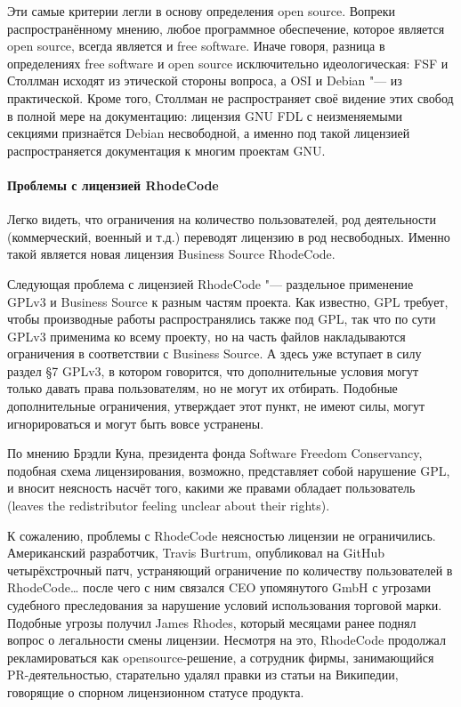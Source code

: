 \documentclass[10pt, a5paper]{article}
\begin{document}
Эти самые критерии легли в основу определения open source. Вопреки распространённому мнению, любое программное обеспечение, которое является open source, всегда является и free software. Иначе говоря, разница в определениях free software и open source исключительно идеологическая: FSF и Столлман исходят из этической стороны вопроса, а OSI и Debian "--- из практической. Кроме того, Столлман не распространяет своё видение этих свобод в полной мере на документацию: лицензия GNU FDL с неизменяемыми секциями признаётся Debian несвободной, а именно под такой лицензией распространяется документация к многим проектам GNU.

\paragraph{Проблемы с лицензией RhodeCode}

Легко видеть, что ограничения на количество пользователей, род деятельности (коммерческий, военный и т.д.) переводят лицензию в род несвободных. Именно такой является новая лицензия Business Source RhodeCode.

Следующая проблема с лицензией RhodeCode "--- раздельное применение GPLv3 и Business Source к разным частям проекта. Как известно, GPL требует, чтобы производные работы распространялись также под GPL, так что по сути GPLv3 применима ко всему проекту, но на часть файлов накладываются ограничения в соответствии с Business Source. А здесь уже вступает в силу раздел §7 GPLv3, в котором говорится, что дополнительные условия могут только давать права пользователям, но не могут их отбирать. Подобные дополнительные ограничения, утверждает этот пункт, не имеют силы, могут игнорироваться и могут быть вовсе устранены.

По мнению Брэдли Куна, президента фонда Software Freedom Conservancy, подобная схема лицензирования, возможно, представляет собой нарушение GPL, и вносит неясность насчёт того, какими же правами обладает пользователь (leaves the redistributor feeling unclear about their rights).

К сожалению, проблемы с RhodeCode неясностью лицензии не ограничились. Американский разработчик, Travis Burtrum, опубликовал на GitHub четырёхстрочный патч, устраняющий ограничение по количеству пользователей в RhodeCode\ldots{} после чего с ним связался CEO упомянутого GmbH с угрозами судебного преследования за нарушение условий использования торговой марки. Подобные угрозы получил James Rhodes, который месяцами ранее поднял вопрос о легальности смены лицензии. Несмотря на это, RhodeCode продолжал рекламироваться как opensource-решение, а сотрудник фирмы, занимающийся PR-деятельностью, старательно удалял правки из статьи на Википедии, говорящие о спорном лицензионном статусе продукта.
\end{document}
